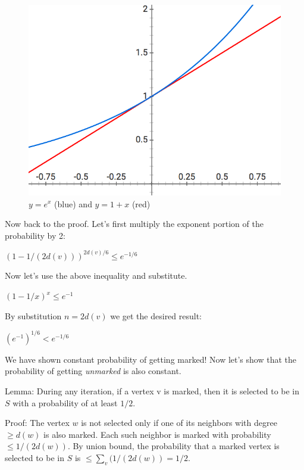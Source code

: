 \documentclass[twoside]{article}
\begin{document}
\begin{figure}[!ht]
\centering
\includegraphics[scale=0.7]{img/inequality.png}
\caption{$y = e^x$ (blue) and $y=1+x$ (red)} \label{fig:inequality} 
\end{figure}

Now back to the proof.  Let's first multiply the exponent portion of the probability by 2:

\begin{center}
$(1 - 1/(2d(v)))^{2d(v)/6} \leq e^{-1/6}$
\end{center}

Now let's use the above inequality and substitute.

\begin{center}
$(1 - 1/x)^{x} \leq e^{-1}$
\end{center}

By substitution $n=2d(v)$ we get the desired result:

\begin{center}
$(e^{-1})^{1/6} < e^{-1/6}$
\end{center}

We have shown constant probability of getting marked!  Now let's show that the probability of getting \textit{unmarked} is also constant.

Lemma:  During any iteration, if a vertex v is marked, then it is selected to be in $S$ with a probability of at least $1/2$.

Proof:  The vertex $w$ is not selected only if one of its neighbors with degree $\geq d(w)$ is also marked.  Each such neighbor is marked with probability $\leq 1/(2d(w))$.  By union bound, the probability that a marked vertex is selected to be in $S$  is $\leq \sum_{v} (1/(2d(w)) = 1/2$.
\end{document}
